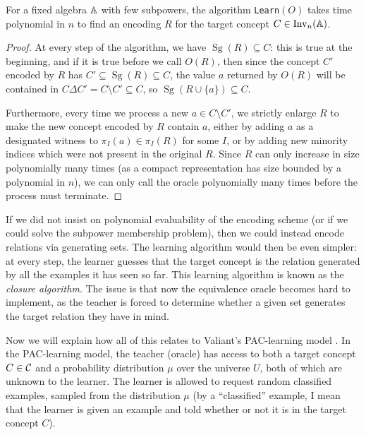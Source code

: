 \documentclass[letterpaper,11pt]{article}
\DeclareMathOperator{\Inv}{Inv}
\DeclareMathOperator{\Sg}{Sg}
\begin{document}
\begin{prop} For a fixed algebra $\mathbb{A}$ with few subpowers, the algorithm \texttt{Learn}$(O)$ takes time polynomial in $n$ to find an encoding $R$ for the target concept $C \in \Inv_n(\bA)$.
\end{prop}
\begin{proof} At every step of the algorithm, we have $\Sg(R) \subseteq C$: this is true at the beginning, and if it is true before we call $O(R)$, then since the concept $C'$ encoded by $R$ has $C' \subseteq \Sg(R) \subseteq C$, the value $a$ returned by $O(R)$ will be contained in $C\Delta C' = C \setminus C' \subseteq C$, so $\Sg(R \cup \{a\}) \subseteq C$.

Furthermore, every time we process a new $a \in C\setminus C'$, we strictly enlarge $R$ to make the new concept encoded by $R$ contain $a$, either by adding $a$ as a designated witness to $\pi_I(a) \in \pi_I(R)$ for some $I$, or by adding new minority indices which were not present in the original $R$. Since $R$ can only increase in size polynomially many times (as a compact representation has size bounded by a polynomial in $n$), we can only call the oracle polynomially many times before the process must terminate.
\end{proof}

\begin{rem} If we did not insist on polynomial evaluability of the encoding scheme (or if we could solve the subpower membership problem), then we could instead encode relations via generating sets. The learning algorithm would then be even simpler: at every step, the learner guesses that the target concept is the relation generated by all the examples it has seen so far. This learning algorithm is known as the \emph{closure algorithm}. The issue is that now the equivalence oracle becomes hard to implement, as the teacher is forced to determine whether a given set generates the target relation they have in mind.%
\end{rem}

Now we will explain how all of this relates to Valiant's PAC-learning model \cite{valiant-pac}. In the PAC-learning model, the teacher (oracle) has access to both a target concept $C \in \mathcal{C}$ and a probability distribution $\mu$ over the universe $U$, both of which are unknown to the learner. The learner is allowed to request random classified examples, sampled from the distribution $\mu$ (by a ``classified'' example, I mean that the learner is given an example and told whether or not it is in the target concept $C$).
\end{document}

